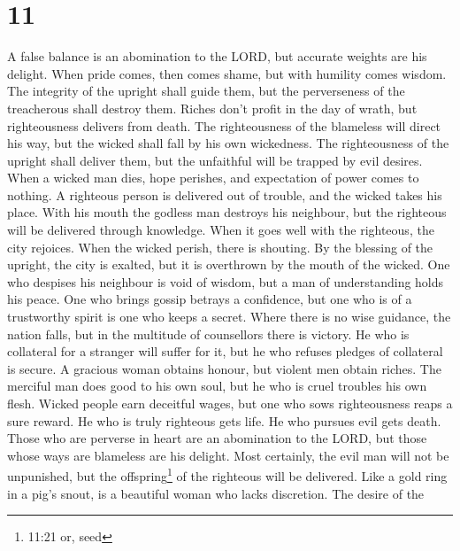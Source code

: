 \hypertarget{section-10}{%
\section{11}\label{section-10}}

 A false balance is an abomination to the LORD, but accurate
weights are his delight.  When pride comes, then comes
shame, but with humility comes wisdom.  The integrity of the
upright shall guide them, but the perverseness of the treacherous shall
destroy them.  Riches don't profit in the day of wrath, but
righteousness delivers from death.  The righteousness of the
blameless will direct his way, but the wicked shall fall by his own
wickedness.  The righteousness of the upright shall deliver
them, but the unfaithful will be trapped by evil desires. 
When a wicked man dies, hope perishes, and expectation of power comes to
nothing.  A righteous person is delivered out of trouble,
and the wicked takes his place.  With his mouth the godless
man destroys his neighbour, but the righteous will be delivered through
knowledge.  When it goes well with the righteous, the city
rejoices. When the wicked perish, there is shouting.  By
the blessing of the upright, the city is exalted, but it is overthrown
by the mouth of the wicked.  One who despises his neighbour
is void of wisdom, but a man of understanding holds his peace.
 One who brings gossip betrays a confidence, but one who is
of a trustworthy spirit is one who keeps a secret.  Where
there is no wise guidance, the nation falls, but in the multitude of
counsellors there is victory.  He who is collateral for a
stranger will suffer for it, but he who refuses pledges of collateral is
secure.  A gracious woman obtains honour, but violent men
obtain riches.  The merciful man does good to his own soul,
but he who is cruel troubles his own flesh.  Wicked people
earn deceitful wages, but one who sows righteousness reaps a sure
reward.  He who is truly righteous gets life. He who
pursues evil gets death.  Those who are perverse in heart
are an abomination to the LORD, but those whose ways are blameless are
his delight.  Most certainly, the evil man will not be
unpunished, but the offspring\footnote{11:21 or, seed} of the righteous
will be delivered.  Like a gold ring in a pig's snout, is a
beautiful woman who lacks discretion.  The desire of the
